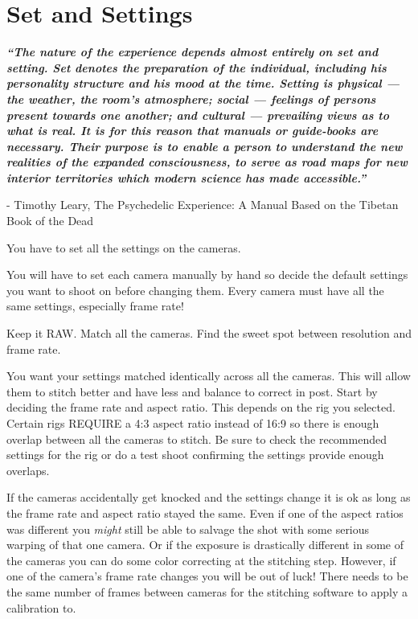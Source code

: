 \section{Set and Settings}
\pagecolor{white}
\label{chap:6}
\begin{fullwidth}

{\itshape\bfseries “The nature of the experience depends almost entirely on set and setting. Set denotes the preparation of the individual, including his personality structure and his mood at the time. Setting is physical — the weather, the room’s atmosphere; social — feelings of persons present towards one another; and cultural — prevailing views as to what is real. It is for this reason that manuals or guide-books are necessary. Their purpose is to enable a person to understand the new realities of the expanded consciousness, to serve as road maps for new interior territories which modern science has made accessible.”}

- Timothy Leary, The Psychedelic Experience: A Manual Based on the Tibetan Book of the Dead
\vspace{\baselineskip}

\problem

{\large You have to set all the settings on the cameras. \par}

You will have to set each camera manually by hand so decide the default settings you want to shoot on before changing them. Every camera must have all the same settings, especially frame rate!

\solution

{\large Keep it RAW. Match all the cameras. Find the sweet spot between resolution and frame rate. \par}

You want your settings matched identically across all the cameras. This will allow them to stitch better and have less \textbf{} and balance to correct in post. Start by deciding the frame rate and aspect ratio. This depends on the rig you selected. Certain rigs REQUIRE a 4:3 aspect ratio instead of 16:9 so there is enough overlap between all the cameras to stitch. Be sure to check the recommended settings for the rig or do a test shoot confirming the settings provide enough overlaps.

If the cameras accidentally get knocked and the settings change it is ok as long as the frame rate and aspect ratio stayed the same. Even if one of the aspect ratios was different you {\it might} still be able to salvage the shot with some serious warping of that one camera. Or if the exposure is drastically different in some of the cameras you can do some color correcting at the stitching step. However, if one of the camera’s frame rate changes you will be out of luck! There needs to be the same number of frames between cameras for the stitching software to apply a calibration to. 


\end{fullwidth}
